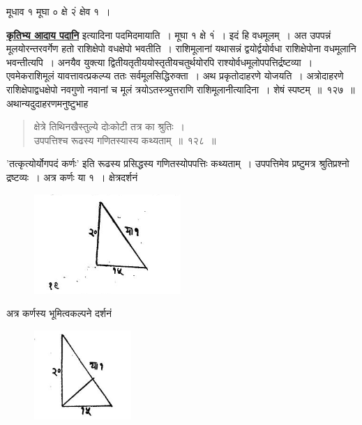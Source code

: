 \documentclass[11pt, openany]{book}
\begin{document}
\begin{center}
     मूधाव १ मूघा ० क्षे २ं क्षेव १~। 
\end{center}

\hyperref[31]{\textbf{कृतिभ्य आदाय पदानि}} इत्यादिना पदमिदमायाति~। मूघा १ क्षे १ं~। इदं हि वधमूलम्~। अत उपपन्नं मूलयोरन्तरवर्गेण हतो राशिक्षेपो वधक्षेपो
भवतीति~। राशिमूलानां यथासन्नं द्वयोर्द्वयोर्वधा राशिक्षेपोना वधमूलानि
भवन्तीत्यपि~। अनयैव युक्त्या द्वितीयतृतीययोस्तृतीयचतुर्थयोरपि
राश्योर्वधमूलोपपत्तिर्द्रष्टव्या~। 
एवमेकराशिमूलं यावत्तावत्प्रकल्प्य ततः सर्वमूलसिद्धिरुक्ता~। अथ प्रकृतोदाहरणे
\newpage
\noindent योजयति~। अत्रोदाहरणे राशिक्षेपाद्वधक्षेपो नवगुणो नवानां च मूलं
त्रयोऽतस्त्र्युत्तराणि राशिमूलानीत्यादिना~। शेषं स्पष्टम्~॥~१२७~॥ \\

\vspace{-2mm}
 अथान्यदुदाहरणमनुष्टुभाह\textendash
\begin{quote}
    \eg
     क्षेत्रे तिथिनखैस्तुल्ये दोःकोटी तत्र का श्रुतिः~। \\
 उपपत्तिश्च रूढस्य गणितस्यास्य कथ्यताम्~॥~१२८~॥~ 
\end{quote}

{\qt 'तत्कृत्योर्योगपदं कर्णः'} इति रूढस्य प्रसिद्धस्य गणितस्योपपत्तिः कथ्यताम्~। उपपत्तिमेव प्रष्टुमत्र श्रुतिप्रश्नो द्रष्टव्यः~। अत्र कर्णः या १~।
क्षेत्रदर्शनं
\begin{figure}[h!]
    \centering
    \includegraphics[scale=0.7]{graphics/Capture6.png}
\end{figure}

 अत्र कर्णस्य भूमित्वकल्पने दर्शनं 
\begin{figure}[h!]
    \centering
    \includegraphics[scale=0.7]{graphics/Capture7.png}
\end{figure}
\end{document}

